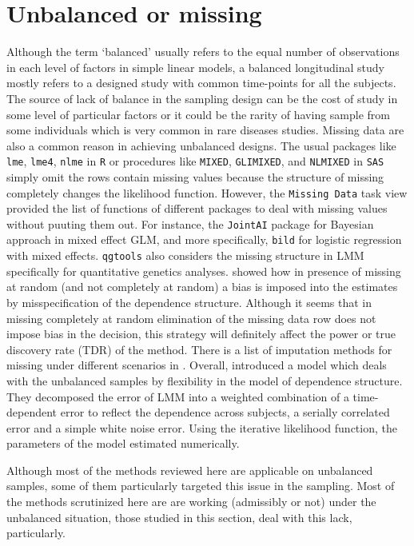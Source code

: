 \documentclass[]{article}
\begin{document}
		\section{Unbalanced or missing}
		Although the term `balanced' usually refers to the equal number of observations in each level of factors in simple linear models, a balanced longitudinal study mostly refers to a designed study with common time-points for all the subjects. The source of lack of balance in the sampling design can be the cost of study in some level of particular factors or it could be the rarity of having sample from some individuals which is very common in rare diseases studies. Missing data are also a common reason in achieving unbalanced designs. The usual packages like \texttt{lme}, \texttt{lme4}, \texttt{nlme} in \texttt{R} or procedures like \texttt{MIXED}, \texttt{GLIMIXED}, and \texttt{NLMIXED} in \texttt{SAS} simply omit the rows contain missing values because the structure of missing \citep[see][Sec. 1.3 for completely at random, at random and not at random missing structures]{LittleRubin2002} completely changes the likelihood function. However, the \texttt{Missing Data} task view \citep{Josse2023} provided the list of functions of different packages to deal with missing values without puuting them out. For instance, the \texttt{JointAI} package for Bayesian approach in mixed effect GLM, and more specifically, \texttt{bild} for logistic regression with mixed effects. \texttt{qgtools} also considers the missing structure in LMM specifically for quantitative genetics analyses. 
		\cite{Laird1988} showed how in presence of missing at random (and not completely at random) a bias is imposed into the estimates by misspecification of the dependence structure. Although it seems that in missing completely at random elimination of the missing data row does not impose bias in the decision, this strategy will definitely affect the power or true discovery rate (TDR) of the method. There is a list of imputation methods for missing under different scenarios in \cite{Huque2018}. Overall, \cite{HuangFitzmaurice2005} introduced a model which deals with the unbalanced samples by flexibility in  the model of dependence structure. They decomposed the error of LMM into a weighted combination of a time-dependent error to reflect the dependence across subjects, a serially correlated error and a simple white noise error. Using the iterative likelihood function, the parameters of the model estimated numerically. 
		
		Although most of the methods reviewed here are applicable on unbalanced samples, some of them particularly targeted this issue in the sampling. Most of the methods scrutinized here are are working (admissibly or not) under the unbalanced situation, those studied in this section, deal with this lack, particularly. 
		
\end{document}
